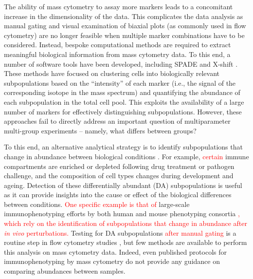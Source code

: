 \documentclass{article}
\newcommand\revised[1]{\textcolor{red}{#1}}
\begin{document}
The ability of mass cytometry to assay more markers leads to a concomitant increase in the dimensionality of the data.
This complicates the data analysis as manual gating and visual examination of biaxial plots (as commonly used in flow cytometry) are no longer feasible when multiple marker combinations have to be considered.
Instead, bespoke computational methods are required to extract meaningful biological information from mass cytometry data. 
To this end, a number of software tools have been developed, including SPADE \cite{qiu2011extracting} and X-shift \cite{samusik2016automated}.
These methods have focused on clustering cells into biologically relevant subpopulations based on the ``intensity'' of each marker (i.e., the signal of the corresponding isotope in the mass spectrum) and quantifying the abundance of each subpopulation in the total cell pool.
This exploits the availability of a large number of markers for effectively distinguishing subpopulations.
However, these approaches fail to directly address an important question of multiparameter multi-group experiments -- namely, what differs between groups?

To this end, an alternative analytical strategy is to identify subpopulations that change in abundance between biological conditions \revised{\cite{gaudilliere2014delayed,gaudilliere2015implementing}}.
For example, \revised{certain} immune compartments are enriched or depleted following drug treatment or pathogen challenge, and the composition of cell types changes during development and ageing.
Detection of these differentially abundant (DA) subpopulations is useful as it can provide insights into the cause or effect of the biological differences between conditions.
\revised{One specific example is that of} large-scale immunophenotyping efforts by both human and mouse phenotyping consortia \cite{maecker2012standardizing,brown2012international,finak2016standardizing}\revised{, which rely on the identification of subpopulations that change in abundance after \textit{in vivo} perturbations.}
Testing for DA subpopulations \revised{after manual gating} is a routine step in flow cytometry studies \cite{saeys2016computational,mittag2011recent}, but few methods are available to perform this analysis on mass cytometry data.
Indeed, even published protocols for immunophenotyping by mass cytometry \cite{leipold2015multiparameter,leelatian2015characterizing} do not provide any guidance on comparing abundances between samples.
\end{document}
